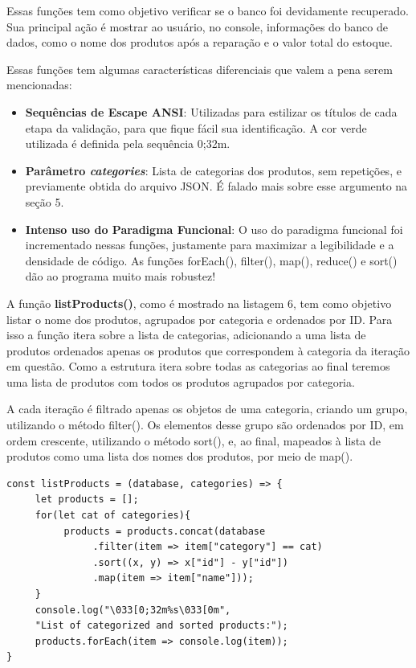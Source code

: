 \documentclass[12pt]{article}
\begin{document}
Essas funções tem como objetivo verificar se o banco foi devidamente recuperado. Sua principal ação é mostrar ao usuário, no console, informações do banco de dados, como o nome dos produtos após a reparação e o valor total do estoque.

Essas funções tem algumas características diferenciais que valem a pena serem mencionadas:

\begin{itemize}
    \item \textbf{Sequências de Escape ANSI}: Utilizadas para estilizar os títulos de cada etapa da validação, para que fique fácil sua identificação. A cor verde utilizada é definida pela sequência 0;32m. 
    \item \textbf{Parâmetro \textit{categories}}: Lista de categorias dos produtos, sem repetições, e previamente obtida do arquivo JSON. É falado mais sobre esse argumento na seção 5.
    \item \textbf{Intenso uso do Paradigma Funcional}: O uso do paradigma funcional foi incrementado nessas funções, justamente para maximizar a legibilidade e a densidade de código. As funções forEach(), filter(), map(), reduce() e sort() dão ao programa muito mais robustez!  
\end{itemize}

A função \textbf{listProducts()}, como é mostrado na listagem 6, tem como objetivo listar o nome dos produtos, agrupados por categoria e ordenados por ID. Para isso a função itera sobre a lista de categorias, adicionando a uma lista de produtos ordenados apenas os produtos que correspondem à categoria da iteração em questão. Como a estrutura itera sobre todas as categorias ao final teremos uma lista de produtos com todos os produtos agrupados por categoria. 

A cada iteração é filtrado apenas os objetos de uma categoria, criando um grupo, utilizando o método filter(). Os elementos desse grupo são ordenados por ID, em ordem crescente, utilizando o método sort(), e, ao final, mapeados à lista de produtos como uma lista dos nomes dos produtos, por meio de map().

\begin{lstlisting}[caption=Função listProducts()]
const listProducts = (database, categories) => {
     let products = [];
     for(let cat of categories){
          products = products.concat(database
               .filter(item => item["category"] == cat)
               .sort((x, y) => x["id"] - y["id"])
               .map(item => item["name"]));
     }
     console.log("\033[0;32m%s\033[0m",
     "List of categorized and sorted products:");
     products.forEach(item => console.log(item));
}
\end{lstlisting}
\end{document}
